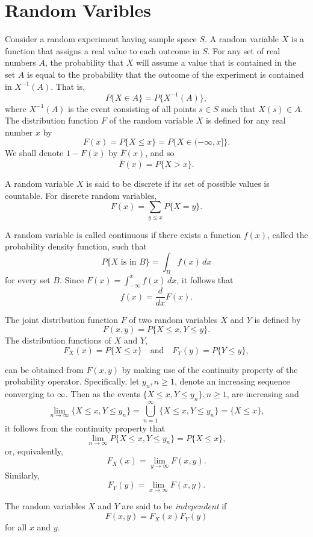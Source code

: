\documentclass[lang=cn,10pt]{elegantbook}
\begin{document}
\section{Random Varibles}
Consider a random experiment having sample space \( S \). A random variable \( X \) is a function that assigns a real value to each outcome in \( S \). For any set of real numbers \( A \), the probability that \( X \) will assume a value that is contained in the set \( A \) is equal to the probability that the outcome of the experiment is contained in \( X^{-1}(A) \). That is,
\[
P\{X \in A\} = P\{X^{-1}(A)\},
\]
where \( X^{-1}(A) \) is the event consisting of all points \( s \in S \) such that \( X(s) \in A \). The distribution function \( F \) of the random variable \( X \) is defined for any real number \( x \) by
\[
F(x) = P\{X \leq x\} = P\{X \in (-\infty, x]\}.
\]
We shall denote \( 1 - F(x) \) by \( \bar{F}(x) \), and so
\[
\bar{F}(x) = P\{X > x\}.
\]

A random variable \( X \) is said to be discrete if its set of possible values is countable. For discrete random variables,
\[
F(x) = \sum_{y \leq x} P\{X = y\}.
\]

A random variable is called continuous if there exists a function \( f(x) \), called the probability density function, such that
\[
P\{X \text{ is in } B\} = \int_B f(x) \, dx
\]
for every set \( B \). Since \( F(x) = \int_{-\infty}^x f(x) \, dx \), it follows that
\[
f(x) = \frac{d}{dx} F(x).
\]

The joint distribution function \( F \) of two random variables \( X \) and \( Y \) is defined by
\[
F(x, y) = P\{X \leq x, Y \leq y\}.
\]
The distribution functions of \( X \) and \( Y \),
\[
F_X(x) = P\{X \leq x\} \quad \text{and} \quad F_Y(y) = P\{Y \leq y\},
\]

can be obtained from \( F(x, y) \) by making use of the continuity property of the probability operator. Specifically, let \( y_n, n \geq 1 \), denote an increasing sequence converging to \( \infty \). Then as the events \( \{X \leq x, Y \leq y_n\}, n \geq 1 \), are increasing and
\[
\lim_{n \to \infty} \{X \leq x, Y \leq y_n\} = \bigcup_{n=1}^{\infty} \{X \leq x, Y \leq y_n\} = \{X \leq x\},
\]
it follows from the continuity property that
\[
\lim_{n \to \infty} P\{X \leq x, Y \leq y_n\} = P\{X \leq x\},
\]
or, equivalently,
\[
F_X(x) = \lim_{y \to \infty} F(x, y).
\]
Similarly,
\[
F_Y(y) = \lim_{x \to \infty} F(x, y).
\]

The random variables \(X\) and \(Y\) are said to be \textit{independent} if
\[
F(x, y) = F_X(x) F_Y(y)
\]
for all \(x\) and \(y\).
\end{document}
